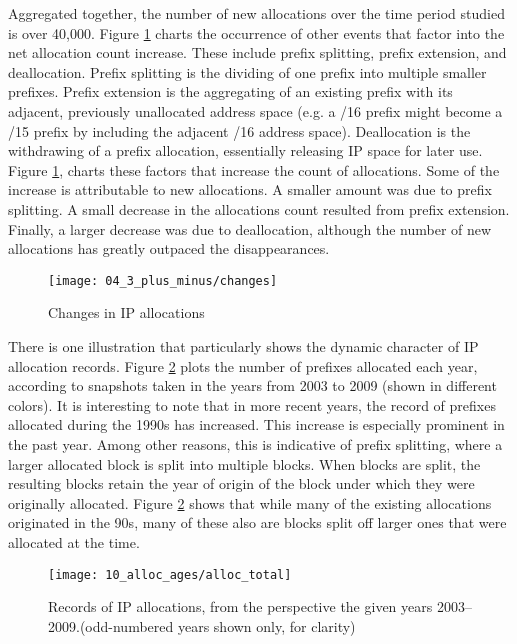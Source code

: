 Aggregated together, the number of new allocations over the time period
studied is over 40,000. Figure \ref{fig:IP allocations new and gone} charts
the occurrence of other events that factor into the net allocation count
increase. These include prefix splitting, prefix extension, and deallocation.
Prefix splitting is the dividing of one prefix into multiple smaller prefixes.
Prefix extension is the aggregating of an existing prefix with its adjacent,
previously unallocated address space (e.g. a /16 prefix might become a /15
prefix by including the adjacent /16 address space). Deallocation is the
withdrawing of a prefix allocation, essentially releasing IP space for later
use. Figure \ref{fig:IP allocations new and gone}, charts these factors that
increase the count of allocations. Some of the increase is attributable to new
allocations. A smaller amount was due to prefix splitting. A small decrease in
the allocations count resulted from prefix extension. Finally, a larger
decrease was due to deallocation, although the number of new allocations has
greatly outpaced the disappearances.

\begin{figure}[htbp]
    \centering
        \texttt{[image: 04\_3\_plus\_minus/changes]}
    \caption{Changes in IP allocations}
    \label{fig:IP allocations new and gone}
\end{figure}

There is one illustration that particularly shows the dynamic character of IP
allocation records. Figure \ref{fig:alloc ages total} plots the number of
prefixes allocated each year, according to snapshots taken in the years from
2003 to 2009 (shown in different colors). It is interesting to note that in
more recent years, the record of prefixes allocated during the 1990s has
increased. This increase is especially prominent in the past year. Among other
reasons, this is indicative of prefix splitting, where a larger allocated
block is split into multiple blocks. When blocks are split, the resulting
blocks retain the year of origin of the block under which they were originally
allocated. Figure \ref{fig:alloc ages total} shows that while many of the
existing allocations originated in the 90s, many of these also are blocks
split off larger ones that were allocated at the time.

\begin{figure}[htbp]
	\centering
		\texttt{[image: 10\_alloc\_ages/alloc\_total]}
	\caption{Records of IP allocations, from the perspective the given years
		     2003--2009.(odd-numbered years shown only, for clarity)}
	\label{fig:alloc ages total}
\end{figure}


